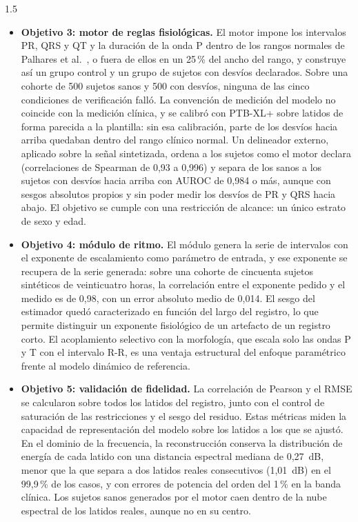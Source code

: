 \begin{spacing}{1.5}
\begin{itemize}
    \item \textbf{Objetivo 3: motor de reglas fisiológicas.} El motor impone los intervalos PR, QRS y QT y la duración de la onda P dentro de los rangos normales de Palhares et al.\ \cite{palhares2017normal}, o fuera de ellos en un 25\,\% del ancho del rango, y construye así un grupo control y un grupo de sujetos con desvíos declarados. Sobre una cohorte de 500 sujetos sanos y 500 con desvíos, ninguna de las cinco condiciones de verificación falló. La convención de medición del modelo no coincide con la medición clínica, y se calibró con PTB-XL+ sobre latidos de forma parecida a la plantilla: sin esa calibración, parte de los desvíos hacia arriba quedaban dentro del rango clínico normal. Un delineador externo, aplicado sobre la señal sintetizada, ordena a los sujetos como el motor declara (correlaciones de Spearman de 0,93 a 0,996) y separa de los sanos a los sujetos con desvíos hacia arriba con AUROC de 0,984 o más, aunque con sesgos absolutos propios y sin poder medir los desvíos de PR y QRS hacia abajo. El objetivo se cumple con una restricción de alcance: un único estrato de sexo y edad.

    \item \textbf{Objetivo 4: módulo de ritmo.} El módulo genera la serie de intervalos con el exponente de escalamiento como parámetro de entrada, y ese exponente se recupera de la serie generada: sobre una cohorte de cincuenta sujetos sintéticos de veinticuatro horas, la correlación entre el exponente pedido y el medido es de 0,98, con un error absoluto medio de 0,014. El sesgo del estimador quedó caracterizado en función del largo del registro, lo que permite distinguir un exponente fisiológico de un artefacto de un registro corto. El acoplamiento selectivo con la morfología, que escala solo las ondas P y T con el intervalo R-R, es una ventaja estructural del enfoque paramétrico frente al modelo dinámico de referencia.

    \item \textbf{Objetivo 5: validación de fidelidad.} La correlación de Pearson y el RMSE se calcularon sobre todos los latidos del registro, junto con el control de saturación de las restricciones y el sesgo del residuo. Estas métricas miden la capacidad de representación del modelo sobre los latidos a los que se ajustó.
    En el dominio de la frecuencia, la reconstrucción conserva la distribución de energía de cada latido con una distancia espectral mediana de 0,27~dB, menor que la que separa a dos latidos reales consecutivos (1,01~dB) en el 99,9\,\% de los casos, y con errores de potencia del orden del 1\,\% en la banda clínica. Los sujetos sanos generados por el motor caen dentro de la nube espectral de los latidos reales, aunque no en su centro.


\end{itemize}
\end{spacing}
